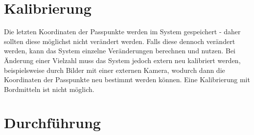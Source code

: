 \documentclass[./00PhotoBox.tex]{subfiles}
\begin{document}
\section{Kalibrierung}
Die letzten Koordinaten der Passpunkte werden im System gespeichert - daher sollten diese möglichst nicht verändert werden. Falls diese dennoch verändert werden, kann das System einzelne Veränderungen berechnen und nutzen. Bei Änderung einer Vielzahl muss das System jedoch extern neu kalibriert werden, beispielsweise durch Bilder mit einer externen Kamera, wodurch dann die Koordinaten der Passpunkte neu bestimmt werden können. Eine Kalibrierung mit Bordmitteln ist nicht möglich.

\section{Durchführung}
\end{document}
